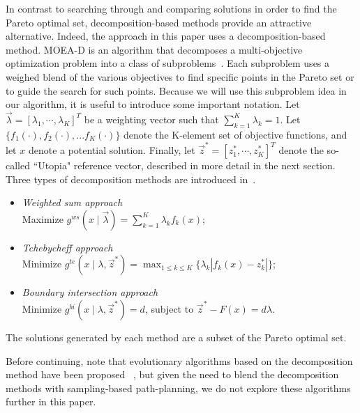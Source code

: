 \documentclass[conference]{IEEEtran}
\begin{document}
In contrast to searching through and comparing solutions in order to find the Pareto optimal set, decomposition-based methods provide an attractive alternative.  
Indeed, the approach in this paper uses a decomposition-based method.  
MOEA-D is an algorithm that decomposes a multi-objective optimization problem into a class of subproblems~\cite{4358754}.  
Each subproblem uses a weighed blend of the various objectives to find specific points in the Pareto set or to guide the search for such points.  
Because we  will use this subproblem idea in our algorithm, it is useful to introduce some important notation.
Let $ \vec{\lambda} = [ \lambda_{1} , \cdots , \lambda_{K}  ]^{T} $ be a weighting vector such that $ \sum_{k=1}^{K} \lambda_{k} = 1 $.  Let $\{f_1(\cdot), f_2(\cdot), ... f_{K}(\cdot)\}$ denote the K-element set of objective functions, and let $x$ denote a potential solution.  Finally, let $ \vec{z}^{*} = [z^{*}_{1}, \cdots , z^{*}_{K}]^{T} $ denote the so-called ``Utopia" reference vector, described in more detail in the next section. 
Three types of decomposition methods are introduced in~\cite{4358754}.
\begin{itemize}
\item \emph{Weighted sum approach} \\
Maximize $ g^{ws} (x \mid \vec{\lambda}) = \sum_{k=1}^{K} \lambda_{k} f_{k} (x) $;
\item \emph{Tchebycheff approach} \\
Minimize $ g^{te} (x \mid \lambda , \vec{z}^{*}) = \max_{1 \leq k \leq K}  \{ \lambda_{k} | f_{k}(x) - z^{*}_{k}  | \} $;
\item \emph{Boundary intersection approach} \\
Minimize $ g^{bi} (x \mid \lambda , \vec{z}^{*} ) = d $, subject to $ \vec{z}^{*} - F(x) = d \lambda $.
\end{itemize}
The solutions generated by each method are a subset of the Pareto optimal set.

Before continuing, note that evolutionary algorithms based on the decomposition method have been proposed ~\cite{6600851}, but given the need to blend the decomposition methods with sampling-based path-planning, we do not explore these algorithms further in this paper.
\end{document}
